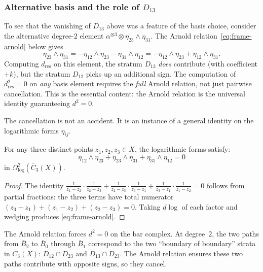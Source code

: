\subsubsection*{Alternative basis and the role of $D_{13}$}

To see that the vanishing of $D_{13}$ above was a feature
of the basis choice, consider the alternative degree-$2$ element
$\alpha^{\otimes 3} \otimes \eta_{23} \wedge \eta_{31}$.
The Arnold relation~\eqref{eq:frame-arnold} below gives
\[
\eta_{23} \wedge \eta_{31}
= -\eta_{12} \wedge \eta_{23} - \eta_{31} \wedge \eta_{12}
= -\eta_{12} \wedge \eta_{23} + \eta_{12} \wedge \eta_{31}.
\]
Computing $d_{\mathrm{res}}$ on this element, the stratum $D_{13}$
\emph{does} contribute (with coefficient $+k$), but the stratum
$D_{12}$ picks up an additional sign.  The computation of
$d_{\mathrm{res}}^2 = 0$ on \emph{any} basis element
requires the \emph{full} Arnold relation, not just pairwise
cancellation.  This is the essential content: the Arnold relation
is the universal identity guaranteeing $d^2 = 0$.

The cancellation is not an accident.  It is an instance of a general
identity on the logarithmic forms $\eta_{ij}$.

\begin{proposition}\label{prop:frame-arnold}
For any three distinct points $z_1, z_2, z_3 \in X$, the
logarithmic forms satisfy:
\begin{equation}\label{eq:frame-arnold}
\eta_{12} \wedge \eta_{23} + \eta_{23} \wedge \eta_{31}
+ \eta_{31} \wedge \eta_{12} = 0
\end{equation}
in $\Omega^2_{\log}(\overline{C}_3(X))$.
\end{proposition}

\begin{proof}
The identity $\frac{1}{z_1-z_2}\cdot\frac{1}{z_2-z_3}
+ \frac{1}{z_2-z_3}\cdot\frac{1}{z_3-z_1}
+ \frac{1}{z_3-z_1}\cdot\frac{1}{z_1-z_2} = 0$
follows from partial fractions: the three terms have
total numerator $(z_3-z_1)+(z_1-z_2)+(z_2-z_3) = 0$.
Taking $d\log$ of each factor and wedging produces
\eqref{eq:frame-arnold}.
\end{proof}

The Arnold relation forces $d^2 = 0$ on the bar complex.  At degree~$2$,
the two paths from $\bar{B}_2$ to $\bar{B}_0$ through $\bar{B}_1$
correspond to the two ``boundary of boundary'' strata in
$\overline{C}_3(X)$: $D_{12} \cap D_{23}$ and $D_{13} \cap D_{23}$.
The Arnold relation ensures these two paths contribute with opposite
signs, so they cancel.

